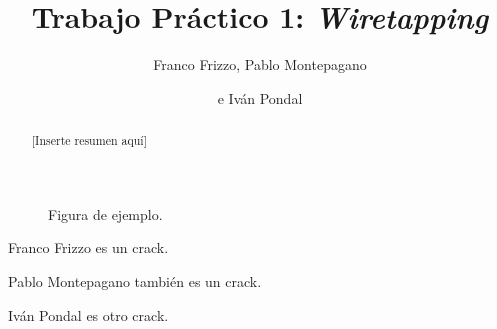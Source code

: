 \documentclass[%
    final,
    notitlepage,
    narroweqnarray,
    inline,
    twoside,
]{ieee}
\begin{document}
\title[Trabajo Práctico 1: Wiretapping]{%
       Trabajo Práctico 1: \emph{Wiretapping}}

\author[FRIZZO, MONTEPAGANO, PONDAL]{Franco Frizzo, Pablo Montepagano
\and{}e Iván Pondal}


\maketitle

\begin{abstract}
[Inserte resumen aquí]
\end{abstract}

\begin{keywords}
\end{keywords}



\begin{figure}[htb]
\caption{Figura de ejemplo.}
\label{fig-example}
\end{figure}




\begin{biography}{Franco Frizzo}
  es un crack.
\end{biography}

\begin{biography}{Pablo Montepagano}
  también es un crack.
\end{biography}

\begin{biography}{Iván Pondal}
  es otro crack.
\end{biography}
\end{document}
